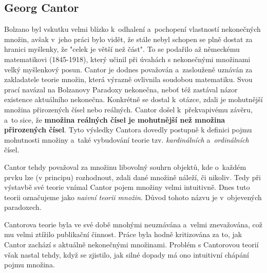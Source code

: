\subsection{Georg Cantor}\label{subsec:cantor}
Bolzano byl vskutku velmi blízko k~odhalení a~pochopení vlastností nekonečných množin, avšak v~jeho práci bylo vidět, že stále nebyl schopen se plně dostat za hranici myšlenky, že "celek je větší než část". To se podařilo až německému matematikovi  \mbox{(1845-1918)}, který učinil při úvahách s nekonečnými množinami velký myšlenkový posun. Cantor je dodnes považován a~zaslouženě uznáván za zakladatele teorie množin, která výrazně ovlivnila soudobou matematiku. Svou prací navázal na Bolzanovy Paradoxy nekonečna, neboť též zastával názor existence aktuálního nekonečna. Konkrétně se dostal k~otázce, zdali je mohutnější množina přirozených čísel nebo reálných. Cantor došel k~překvapivému závěru, a~to sice, že \textbf{množina reálných čísel je mohutnější než množina přirozených čísel}. Tyto výsledky Cantora dovedly postupně k definici pojmu mohutnosti množiny a~také vybudování teorie tzv. \emph{kardinálních} a~\emph{ordinálních} čísel.\par
Cantor tehdy považoval za množinu libovolný souhrn objektů, kde o~každém prvku lze (v principu) rozhodnout, zdali dané množině náleží, či nikoliv. Tedy při výstavbě své teorie vnímal Cantor pojem množiny velmi intuitivně. Dnes tuto teorii označujeme jako \emph{naivní teorii množin}. Důvod tohoto názvu je v~objevených paradoxech.\par
Cantorova teorie byla ve své době mnohými neuznávána a~velmi znevažována, což mu velmi ztížilo publikační činnost. Práce byla hodně kritizována za to, jak Cantor zachází s aktuálně nekonečnými množinami. Problém s Cantorovou teorií však nastal tehdy, když se zjistilo, jak silné dopady má ono intuitivní chápání pojmu množina.

